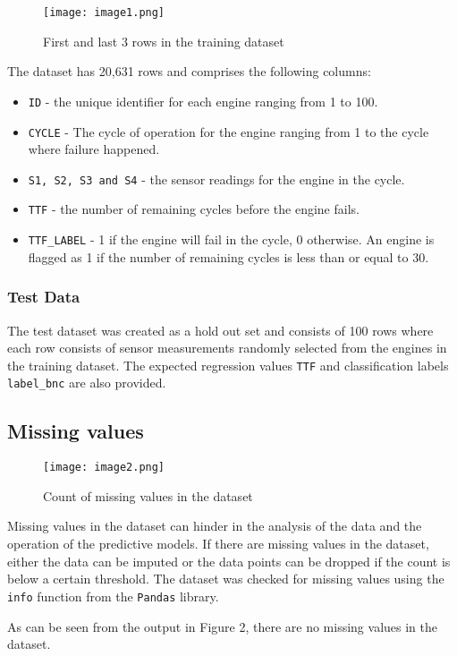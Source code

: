\documentclass{article}
\begin{document}
\begin{figure}[h]
	\centering
	\texttt{[image: image1.png]}
	\caption{First and last 3 rows in the training dataset}
\end{figure}

The dataset has 20,631 rows and comprises the following columns:
\begin{itemize}[topsep=0pt]
	\item \texttt{ID} - the unique identifier for each engine ranging from 1 to 100.
	\item \texttt{CYCLE} - The cycle of operation for the engine ranging from 1 to the cycle where failure happened.
	\item \texttt{S1, S2, S3 and S4} - the sensor readings for the engine in the cycle.
	\item \texttt{TTF} - the number of remaining cycles before the engine fails.
	\item \texttt{TTF\_LABEL} - 1 if the engine will fail in the cycle, 0 otherwise. An engine is flagged as 1 if the number of remaining cycles is less than or equal to 30.
\end{itemize}
\subsubsection{Test Data}
The test dataset was created as a hold out set and consists of 100 rows where each row consists of sensor measurements randomly selected from the engines in the training dataset.
The expected regression values \texttt{TTF} and classification labels \texttt{label\_bnc} are also provided.
\subsection{Missing values}
\begin{wrapfigure}[8]{r}{0.4\textwidth}
	\vspace{-45pt}
	\texttt{[image: image2.png]}
	\caption{Count of missing values in the dataset}
\end{wrapfigure}
Missing values in the dataset can hinder in the analysis of the data and the operation of the predictive models.
If there are missing values in the dataset, either the data can be imputed or the data points can be dropped if the count is below a certain threshold.
The dataset was checked for missing values using the \texttt{info} function from the \texttt{Pandas} library.

As can be seen from the output in Figure 2, there are no missing values in the dataset.
\newpage
\end{document}
